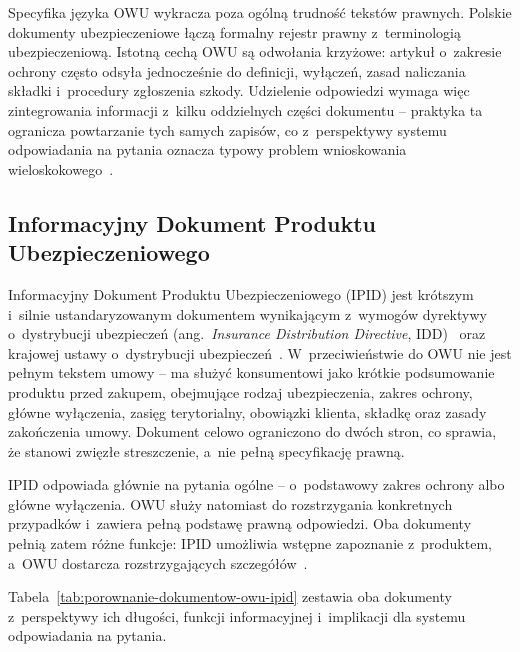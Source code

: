 Specyfika języka OWU wykracza poza ogólną trudność tekstów prawnych. Polskie
dokumenty ubezpieczeniowe łączą formalny rejestr prawny z~terminologią
ubezpieczeniową. Istotną cechą OWU są odwołania krzyżowe: artykuł o~zakresie
ochrony często odsyła jednocześnie do definicji, wyłączeń, zasad naliczania
składki i~procedury zgłoszenia szkody. Udzielenie odpowiedzi wymaga więc
zintegrowania informacji z~kilku oddzielnych części dokumentu -- praktyka ta
ogranicza powtarzanie tych samych zapisów, co z~perspektywy systemu
odpowiadania na pytania oznacza typowy problem wnioskowania
wieloskokowego~\cite{koreeda2021contractnli, yang2018hotpotqa}.

\subsection{Informacyjny Dokument Produktu Ubezpieczeniowego}\label{subsec:ipid}

Informacyjny Dokument Produktu Ubezpieczeniowego (IPID) jest krótszym i~silnie
ustandaryzowanym dokumentem wynikającym z~wymogów dyrektywy o~dystrybucji
ubezpieczeń (ang.~\textit{Insurance Distribution Directive},
IDD)~\cite{idd2016} oraz krajowej ustawy o~dystrybucji
ubezpieczeń~\cite{ustawa2017dystrybucja}. W~przeciwieństwie do OWU nie jest
pełnym tekstem umowy -- ma służyć konsumentowi jako krótkie podsumowanie
produktu przed zakupem, obejmujące rodzaj ubezpieczenia, zakres ochrony, główne
wyłączenia, zasięg terytorialny, obowiązki klienta, składkę oraz zasady
zakończenia umowy. Dokument celowo ograniczono do dwóch stron, co sprawia, że
stanowi zwięzłe streszczenie, a~nie pełną specyfikację prawną.

IPID odpowiada głównie na pytania ogólne -- o~podstawowy zakres ochrony albo
główne wyłączenia. OWU służy natomiast do rozstrzygania konkretnych przypadków
i~zawiera pełną podstawę prawną odpowiedzi. Oba dokumenty pełnią zatem różne
funkcje: IPID umożliwia wstępne zapoznanie z~produktem, a~OWU dostarcza
rozstrzygających szczegółów~\cite{idd2016, ustawa2017dystrybucja}.

Tabela~\ref{tab:porownanie-dokumentow-owu-ipid} zestawia oba dokumenty
z~perspektywy ich długości, funkcji informacyjnej i~implikacji dla systemu
odpowiadania na pytania.

